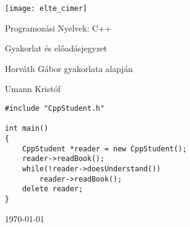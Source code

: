 \documentclass[a4paper,11.5pt, table]{article}
\begin{document}
	\renewcommand{\onlyinsubfile}[1]{}
	\renewcommand{\notinsubfile}[1]{#1}
	
	\begin{titlepage}
		\vspace*{2cm}
		\centering
		\texttt{[image: elte\_cimer]}
		
		\vspace*{2cm}
		{\Huge Programozási Nyelvek: C++ }
		
		\vspace{1cm}
		{\huge Gyakorlat és előadásjegyzet}
		
		\vspace*{5mm}
		{\large Horváth Gábor gyakorlata alapján}
		\vspace*{1.5cm}
		
		{\large Umann Kristóf}
		\vfill
		
		\begin{lstlisting}[frame=trbl, linewidth=12cm, xleftmargin=4.1cm, emph={CppStudent}]
#include "CppStudent.h"

int main()
{
	CppStudent *reader = new CppStudent();
	reader->readBook();
	while(!reader->doesUnderstand())
		reader->readBook();	
	delete reader;
}
		\end{lstlisting}
		\vfill
		
		\vspace*{1cm}
		\today
	\end{titlepage}
	\tableofcontents
	\pagebreak
	
	
	
	
	
	
	
	
	
	
	
	
\end{document}
